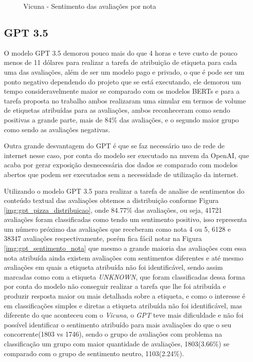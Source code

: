 \begin{figure}
\begin{minipage}{1\textwidth}
		\caption{Vicuna - Sentimento das avaliações por nota}
		\label{img:vicuna_sentimento_nota}
	\end{minipage}
\end{figure}

\subsection{GPT 3.5}
\label{sec:resultados:subsec:gpt}


O modelo GPT 3.5 demorou pouco mais do que 4 horas e teve custo de pouco menos de 11 dólares para realizar a tarefa de atribuição de etiqueta para cada uma das avaliações, além de ser um modelo pago e privado, o que é pode ser um ponto negativo dependendo do projeto que se está executando, ele demorou um tempo consideravelmente maior se comparado com os modelos BERTs e para a tarefa proposta no trabalho ambos realizaram uma simular em termos de volume de etiquetas atribuídas para as avaliações, ambos reconheceram como sendo positivas a grande parte, mais de 84\% das avaliações, e o segundo maior grupo como sendo as avaliações negativas.

Outra grande desvantagem do GPT é que se faz necessário uso de rede de internet nesse caso, por conta do modelo ser executado na nuvem da OpenAI, que acaba por gerar exposição desnecessária dos dados se comparado com modelos abertos que podem ser executados sem a necessidade de utilização da internet.

Utilizando o modelo GPT 3.5 para realizar a tarefa de analise de sentimentos do conteúdo textual das avaliações obtemos a distribuição conforme Figura \ref{img:gpt_pizza_distribuicao}, onde 84.77\% das avaliações, ou seja, 41721 avaliações foram classificadas como tendo um sentimento positivo, isso representa um número próximo das avaliações que receberam como nota 4 ou 5, 6128 e 38347 avaliações respectivamente, porém fica fácil notar na Figura \ref{img:gpt_sentimento_nota} que mesmo a grande maioria das avaliações com essa nota atribuída ainda existem avaliações com sentimentos diferentes e até mesmo avaliações em quais a etiqueta atribuída não foi identificável, sendo assim marcadas como com a etiqueta \textit{UNKNOWN}, que foram classificadas dessa forma por conta do modelo não conseguir realizar a tarefa que lhe foi atribuída e produzir resposta maior ou mais detalhada sobre a etiqueta, e como o interesse é em classificações simples e diretas a etiqueta atribuída não foi identificável, mas diferente do que aconteceu com o \textit{Vicuna}, o \textit{GPT} teve mais dificuldade e não foi possível identificar o sentimento atribuído para mais avaliações do que o seu concorrente(1803 vs 1746), sendo o grupo de avaliações com problema na classificação um grupo com maior quantidade de avaliações, 1803(3.66\%) se comparado com o grupo de sentimento neutro, 1103(2.24\%).

